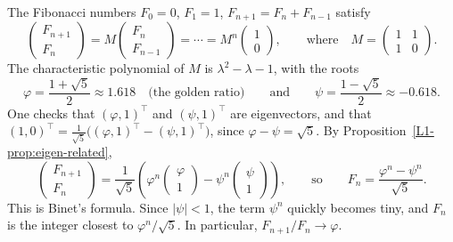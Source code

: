 \begin{example}\label{L1-ex:binet}
    The Fibonacci numbers $F_0 = 0$, $F_1 = 1$, $F_{n+1} = F_n + F_{n-1}$ satisfy
    \[\begin{pmatrix} F_{n+1} \\ F_n \end{pmatrix} = M \begin{pmatrix} F_n \\ F_{n-1} \end{pmatrix} = \cdots = M^n \begin{pmatrix} 1 \\ 0 \end{pmatrix}, \qquad \text{where} \quad M = \begin{pmatrix} 1 & 1 \\ 1 & 0 \end{pmatrix}.\]
    The characteristic polynomial of $M$ is $\lambda^2 - \lambda - 1$, with the roots
    \[\varphi = \frac{1 + \sqrt{5}}{2} \approx 1.618 \quad \text{(the golden ratio)} \qquad \text{and} \qquad \psi = \frac{1 - \sqrt{5}}{2} \approx -0.618.\]
    One checks that $(\varphi, 1)^\top$ and $(\psi, 1)^\top$ are eigenvectors, and that $(1, 0)^\top = \frac{1}{\sqrt{5}}\big((\varphi, 1)^\top - (\psi, 1)^\top\big)$, since $\varphi - \psi = \sqrt{5}$. By Proposition~\ref{L1-prop:eigen-related},
    \[\begin{pmatrix} F_{n+1} \\ F_n \end{pmatrix} = \frac{1}{\sqrt{5}}\left(\varphi^n \begin{pmatrix} \varphi \\ 1 \end{pmatrix} - \psi^n \begin{pmatrix} \psi \\ 1 \end{pmatrix}\right), \qquad \text{so} \qquad F_n = \frac{\varphi^n - \psi^n}{\sqrt{5}}.\]
    This is Binet's formula. Since $|\psi| < 1$, the term $\psi^n$ quickly becomes tiny, and $F_n$ is the integer closest to $\varphi^n / \sqrt{5}$. In particular, $F_{n+1}/F_n \to \varphi$.
\end{example}

